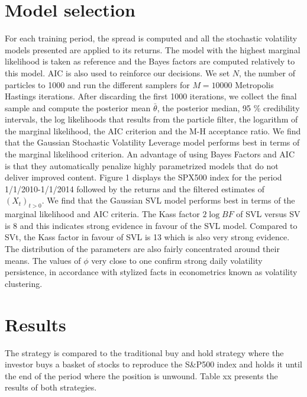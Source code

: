 \documentclass[11pt,a4,twosided,singlespacing,titlepagenumber=on]{scrreprt}
\numberwithin{equation}{chapter} %
\theoremstyle{remark}
\begin{document}
\section{Model selection}
For each training period, the spread is computed and all the stochastic volatility models presented are applied to its returns. The model with the highest marginal likelihood is taken as reference and the Bayes factors are computed relatively to this model. AIC is also used to reinforce our decisions. We set $N$, the number of particles to 1000 and run the different samplers for $M = 10000$ Metropolis Hastings iterations. After discarding the first 1000 iterations, we collect the final sample and compute the posterior mean $\bar{\theta}$, the posterior median, 95 \% credibility intervals, the log likelihoods that results from the particle filter, the logarithm of the marginal likelihood, the AIC criterion and the M-H acceptance ratio. We find that the Gaussian Stochastic Volatility Leverage model performs best in terms of the marginal likelihood criterion. An advantage of using Bayes Factors and AIC is that they automatically penalize highly parametrized models that do not deliver improved content. Figure 1 displays the SPX500 index for the period 1/1/2010-1/1/2014 followed by the returns and the filtered estimates of $(X_t)_{t>0}$.
We find that the Gaussian SVL model performs best in terms of the marginal likelihood and AIC criteria. The Kass factor $2 \log BF$ of SVL versus SV is 8 and this indicates strong evidence in favour of the SVL model. Compared to SVt, the Kass factor in favour of SVL is 13 which is also very strong evidence. The distribution of the parameters are also fairly concentrated around their means. The values of $\phi$ very close to one confirm strong daily volatility persistence, in accordance with stylized facts in econometrics known as volatility clustering.

\section{Results}

The strategy is compared to the traditional buy and hold strategy where the investor buys a basket of stocks to reproduce the S\&P500 index and holds it until the end of the period where the position is unwound. Table xx presents the results of both strategies.
\end{document}
